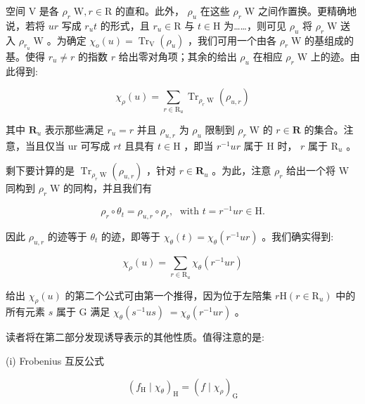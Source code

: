 \documentclass[10pt]{article}
\begin{document}
空间 \(\mathrm{V}\) 是各 \({\rho }_{r}\mathrm{\;W},r \in  \mathrm{R}\) 的直和。此外， \({\rho }_{u}\) 在这些 \({\rho }_{r}\mathrm{\;W}\) 之间作置换。更精确地说，若将 \({ur}\) 写成 \({r}_{u}t\) 的形式，且 \({r}_{u} \in  \mathrm{R}\) 与 \(t \in  \mathrm{H}\) 为……，则可见 \({\rho }_{u}\) 将 \({\rho }_{r}\mathrm{\;W}\) 送入 \({\rho }_{{r}_{u}}\mathrm{\;W}\) 。为确定 \({\chi }_{o}\left( u\right)  = {\operatorname{Tr}}_{\mathrm{V}}\left( {\rho }_{u}\right)\) ，我们可用一个由各 \({\rho }_{r}\mathrm{\;W}\) 的基组成的基。使得 \({r}_{u} \neq  r\) 的指数 \(r\) 给出零对角项；其余的给出 \({\rho }_{u}\) 在相应 \({\rho }_{r}\mathrm{\;W}\) 上的迹。由此得到:

\[
{\chi }_{\rho }\left( u\right)  = \mathop{\sum }\limits_{{r \in  {\mathrm{R}}_{u}}}{\operatorname{Tr}}_{{\rho }_{r}\mathrm{\;W}}\left( {\rho }_{u,r}\right)
\]

其中 \({\mathbf{R}}_{u}\) 表示那些满足 \({r}_{u} = r\) 并且 \({\rho }_{u,r}\) 为 \({\rho }_{u}\) 限制到 \({\rho }_{r}\mathrm{\;W}\) 的 \(r \in  \mathbf{R}\) 的集合。注意，当且仅当 ur 可写成 \({rt}\) 且具有 \(t \in  \mathrm{H}\) ，即当 \({r}^{-1}{ur}\) 属于 \(\mathrm{H}\) 时， \(r\) 属于 \({\mathrm{R}}_{u}\) 。

剩下要计算的是 \({\operatorname{Tr}}_{{\rho }_{r}\mathrm{\;W}}\left( {\rho }_{u,r}\right)\) ，针对 \(r \in  {\mathbf{R}}_{u}\) 。为此，注意 \({\rho }_{r}\) 给出一个将 \(\mathrm{W}\) 同构到 \({\rho }_{r}\mathrm{\;W}\) 的同构，并且我们有

\[
{\rho }_{r} \circ  {\theta }_{t} = {\rho }_{u,r} \circ  {\rho }_{r},\;\text{ with }t = {r}^{-1}{ur} \in  \mathrm{H}.
\]

因此 \({\rho }_{u,r}\) 的迹等于 \({\theta }_{t}\) 的迹，即等于 \({\chi }_{\theta }\left( t\right)  = {\chi }_{\theta }\left( {{r}^{-1}{ur}}\right)\) 。我们确实得到:

\[
{\chi }_{\rho }\left( u\right)  = \mathop{\sum }\limits_{{r \in  {\mathrm{R}}_{u}}}{\chi }_{\theta }\left( {{r}^{-1}{ur}}\right)
\]

给出 \({\chi }_{\rho }\left( u\right)\) 的第二个公式可由第一个推得，因为位于左陪集 \(r\mathrm{H}\left( {r \in  {\mathrm{R}}_{u}}\right)\) 中的所有元素 \(s\) 属于 \(\mathrm{G}\) 满足 \({\chi }_{\theta }\left( {{s}^{-1}{us}}\right) \; = {\chi }_{\theta }\left( {{r}^{-1}{ur}}\right)\) 。

读者将在第二部分发现诱导表示的其他性质。值得注意的是:

(i) Frobenius 互反公式

\[
{\left( {f}_{\mathrm{H}} \mid  {\chi }_{\theta }\right) }_{\mathrm{H}} = {\left( f \mid  {\chi }_{\rho }\right) }_{\mathrm{G}}
\]
\end{document}

